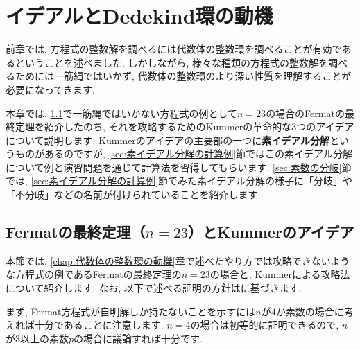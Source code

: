 \documentclass[11pt,b5paper,oneside,titlepage,lualatex]{ltjsreport}
\begin{document}
\clearpage


\chapter{イデアルとDedekind環の動機} \label{chap:イデアルとDedekind環の動機}


前章では, 方程式の整数解を調べるには代数体の整数環を調べることが有効であるということを述べました. 
しかしながら, 様々な種類の方程式の整数解を調べるためには一筋縄ではいかず, 代数体の整数環のより深い性質を理解することが必要になってきます. 

本章では, \ref{sec:Fermatの最終定理（n=23）}で一筋縄ではいかない方程式の例として$ n=23 $の場合のFermatの最終定理を紹介したのち, それを攻略するためのKummerの革命的な3つのアイデアについて説明します. 
Kummerのアイデアの主要部の一つに\textbf{素イデアル分解}というものがあるのですが, \ref{sec:素イデアル分解の計算例}節ではこの素イデアル分解について例と演習問題を通じて計算法を習得してもらいます. 
\ref{sec:素数の分岐}節では, \ref{sec:素イデアル分解の計算例}節でみた素イデアル分解の様子に「分岐」や「不分岐」などの名前が付けられていることを紹介します. 


\section{Fermatの最終定理（$ n=23 $）とKummerのアイデア} \label{sec:Fermatの最終定理（n=23）}


本節では, \ref{chap:代数体の整数環の動機}章で述べたやり方では攻略できないような方程式の例であるFermatの最終定理の$ n=23 $の場合と, Kummerによる攻略法について紹介します. 
なお, 以下で述べる証明の方針は\cite[定理 8.11.15]{Yukie1}に基づきます. 

まず, Fermat方程式が自明解しか持たないことを示すには$ n $が$ 4 $か素数の場合に考えれば十分であることに注意します. 
$ n=4 $の場合は初等的に証明できるので, $ n $が$ 3 $以上の素数$ p $の場合に議論すれば十分です. 
\end{document}
